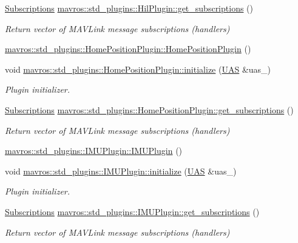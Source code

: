 \begin{DoxyCompactItemize}
\mbox{\hyperlink{group__plugin_ga8967d61fc77040e0c3ea5a4585d62a09}{Subscriptions}} \mbox{\hyperlink{group__plugin_ga393b7527b376fb0e4706ac4f3d9298a3}{mavros\+::std\+\_\+plugins\+::\+Hil\+Plugin\+::get\+\_\+subscriptions}} ()
\begin{DoxyCompactList}\small\item\em Return vector of M\+A\+V\+Link message subscriptions (handlers) \end{DoxyCompactList}\item 
\mbox{\hyperlink{group__plugin_gabfbef02bbcde71f9210b3289ace49100}{mavros\+::std\+\_\+plugins\+::\+Home\+Position\+Plugin\+::\+Home\+Position\+Plugin}} ()
\item 
void \mbox{\hyperlink{group__plugin_ga79d40eaf420dfce7a44db82cc6b46331}{mavros\+::std\+\_\+plugins\+::\+Home\+Position\+Plugin\+::initialize}} (\mbox{\hyperlink{classmavros_1_1UAS}{U\+AS}} \&uas\+\_\+)
\begin{DoxyCompactList}\small\item\em Plugin initializer. \end{DoxyCompactList}\item 
\mbox{\hyperlink{group__plugin_ga8967d61fc77040e0c3ea5a4585d62a09}{Subscriptions}} \mbox{\hyperlink{group__plugin_ga09ac4c0f6994b81c5e7f5b072f71e7d2}{mavros\+::std\+\_\+plugins\+::\+Home\+Position\+Plugin\+::get\+\_\+subscriptions}} ()
\begin{DoxyCompactList}\small\item\em Return vector of M\+A\+V\+Link message subscriptions (handlers) \end{DoxyCompactList}\item 
\mbox{\hyperlink{group__plugin_gacec05dbf6f6696b457df134f2b92c3e8}{mavros\+::std\+\_\+plugins\+::\+I\+M\+U\+Plugin\+::\+I\+M\+U\+Plugin}} ()
\item 
void \mbox{\hyperlink{group__plugin_ga93f6f8e41038c821e395ef26bd27c905}{mavros\+::std\+\_\+plugins\+::\+I\+M\+U\+Plugin\+::initialize}} (\mbox{\hyperlink{classmavros_1_1UAS}{U\+AS}} \&uas\+\_\+)
\begin{DoxyCompactList}\small\item\em Plugin initializer. \end{DoxyCompactList}\item 
\mbox{\hyperlink{group__plugin_ga8967d61fc77040e0c3ea5a4585d62a09}{Subscriptions}} \mbox{\hyperlink{group__plugin_ga380625ad9d721e273b204b1b74724e40}{mavros\+::std\+\_\+plugins\+::\+I\+M\+U\+Plugin\+::get\+\_\+subscriptions}} ()
\begin{DoxyCompactList}\small\item\em Return vector of M\+A\+V\+Link message subscriptions (handlers) \end{DoxyCompactList}\item 

\end{DoxyCompactItemize}
